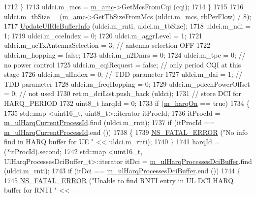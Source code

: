 \begin{DoxyCode}
1712             \}
1713           uldci.m\_mcs = \hyperlink{classns3_1_1FdBetFfMacScheduler_ab6734e88a03f8d5085607802a0b49bbb}{m\_amc}->GetMcsFromCqi (cqi);
1714         \}
1715 
1716       uldci.m\_tbSize = (\hyperlink{classns3_1_1FdBetFfMacScheduler_ab6734e88a03f8d5085607802a0b49bbb}{m\_amc}->GetTbSizeFromMcs (uldci.m\_mcs, rbPerFlow) / 8);
1717       \hyperlink{classns3_1_1FdBetFfMacScheduler_a08d27a5a34c139814bacf94805731035}{UpdateUlRlcBufferInfo} (uldci.m\_rnti, uldci.m\_tbSize);
1718       uldci.m\_ndi = 1;
1719       uldci.m\_cceIndex = 0;
1720       uldci.m\_aggrLevel = 1;
1721       uldci.m\_ueTxAntennaSelection = 3; \textcolor{comment}{// antenna selection OFF}
1722       uldci.m\_hopping = \textcolor{keyword}{false};
1723       uldci.m\_n2Dmrs = 0;
1724       uldci.m\_tpc = 0; \textcolor{comment}{// no power control}
1725       uldci.m\_cqiRequest = \textcolor{keyword}{false}; \textcolor{comment}{// only period CQI at this stage}
1726       uldci.m\_ulIndex = 0; \textcolor{comment}{// TDD parameter}
1727       uldci.m\_dai = 1; \textcolor{comment}{// TDD parameter}
1728       uldci.m\_freqHopping = 0;
1729       uldci.m\_pdcchPowerOffset = 0; \textcolor{comment}{// not used}
1730       ret.m\_dciList.push\_back (uldci);
1731       \textcolor{comment}{// store DCI for HARQ\_PERIOD}
1732       uint8\_t harqId = 0;
1733       \textcolor{keywordflow}{if} (\hyperlink{classns3_1_1FdBetFfMacScheduler_a37792b61da166e932f6697569d19a479}{m\_harqOn} == \textcolor{keyword}{true})
1734         \{
1735           std::map <uint16\_t, uint8\_t>::iterator itProcId;
1736           itProcId = \hyperlink{classns3_1_1FdBetFfMacScheduler_a12a5dedfa74cd590624828dcffafa855}{m\_ulHarqCurrentProcessId}.find (uldci.m\_rnti);
1737           \textcolor{keywordflow}{if} (itProcId == \hyperlink{classns3_1_1FdBetFfMacScheduler_a12a5dedfa74cd590624828dcffafa855}{m\_ulHarqCurrentProcessId}.end ())
1738             \{
1739               \hyperlink{group__fatal_ga5131d5e3f75d7d4cbfd706ac456fdc85}{NS\_FATAL\_ERROR} (\textcolor{stringliteral}{"No info find in HARQ buffer for UE "} << uldci.m\_rnti);
1740             \}
1741           harqId = (*itProcId).second;
1742           std::map <uint16\_t, UlHarqProcessesDciBuffer\_t>::iterator itDci = 
      \hyperlink{classns3_1_1FdBetFfMacScheduler_a9b0359136a7f50a8baf80b3b17367869}{m\_ulHarqProcessesDciBuffer}.find (uldci.m\_rnti);
1743           \textcolor{keywordflow}{if} (itDci == \hyperlink{classns3_1_1FdBetFfMacScheduler_a9b0359136a7f50a8baf80b3b17367869}{m\_ulHarqProcessesDciBuffer}.end ())
1744             \{
1745               \hyperlink{group__fatal_ga5131d5e3f75d7d4cbfd706ac456fdc85}{NS\_FATAL\_ERROR} (\textcolor{stringliteral}{"Unable to find RNTI entry in UL DCI HARQ buffer for RNTI "} << 

\end{DoxyCode}
